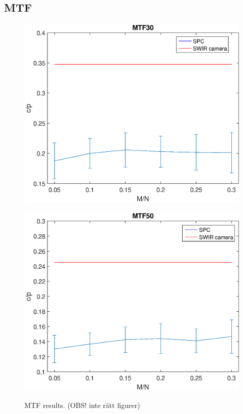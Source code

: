 \subsection{MTF}


\begin{figure}[H]
    \centering
    \begin{minipage}{0.49\textwidth}
    \includegraphics[width=1\textwidth]{result/mtf/mtf30.eps}
    \label{fig:mtf30}
\end{minipage}
\begin{minipage}{0.49\textwidth}
    \includegraphics[width = \textwidth]{result/mtf/mtf50.eps}
    \label{fig:i2}
\end{minipage}
    \caption{MTF results. (OBS! inte rätt figurer)}
    \label{fig:mtf50}
\end{figure}

